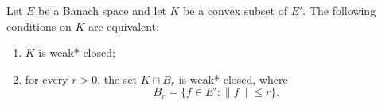 Let $E$ be a Banach space and let $K$ be a convex subset of $E'$. The following conditions on $K$ are equivalent:
\begin{enumerate}
\item[(a)] $K$ is weak* closed;
\item[(b)] for every $r > 0$, the set $K \cap B_r$ is weak* closed, where
$$
B_r = \{ f \in E' : \|f\| \leq r \}.
$$
\end{enumerate}
